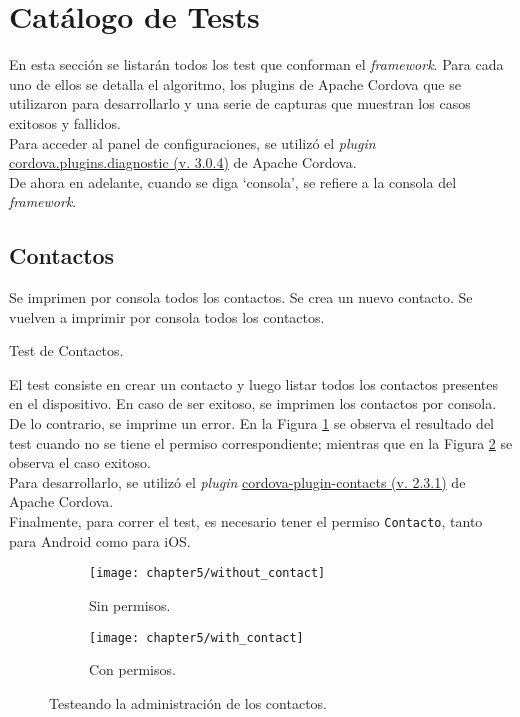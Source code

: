 \section{Catálogo de Tests}
En esta sección se listarán todos los test que conforman el \textit{framework}. Para cada uno de ellos se detalla el algoritmo, los plugins de Apache Cordova que se utilizaron para desarrollarlo y una serie de capturas que muestran los casos exitosos y fallidos.\\

Para acceder al panel de configuraciones, se utilizó el \textit{plugin} \href{https://www.npmjs.com/package/cordova.plugins.diagnostic}{cordova.plugins.diagnostic (v. 3.0.4)} de Apache Cordova.\\

De ahora en adelante, cuando se diga `consola', se refiere a la consola del \textit{framework}.
\subsection{Contactos}
\begin{algorithm}
	\begin{algorithmic}[1]
		\STATE Se imprimen por consola todos los contactos.
		\STATE Se crea un nuevo contacto.
		\STATE Se vuelven a imprimir por consola todos los contactos.
	\end{algorithmic}
	\caption{Test de Contactos.}\label{alg:chap5:test_contactos}
\end{algorithm}
El test consiste en crear un contacto y luego listar todos los contactos presentes en el dispositivo. En caso de ser exitoso, se imprimen los contactos por consola. De lo contrario, se imprime un error. En la Figura \ref{fig:ch05:without_contact} se observa el resultado del test cuando no se tiene el permiso correspondiente; mientras que en la Figura \ref{fig:ch05:with_contact} se observa el caso exitoso.\\

Para desarrollarlo, se utilizó el \textit{plugin} \href{https://www.npmjs.com/package/cordova-plugin-contacts}{cordova-plugin-contacts (v. 2.3.1)} de Apache Cordova.\\

Finalmente, para correr el test, es necesario tener el permiso \texttt{Contacto}, tanto para Android como para iOS.
\begin{figure}[htbp]
    \centering
    \begin{subfigure}{0.3\linewidth}
        \texttt{[image: chapter5/without\_contact]}
        \caption{Sin permisos.}
        \label{fig:ch05:without_contact}
    \end{subfigure}
    \begin{subfigure}{0.3\linewidth}
        \texttt{[image: chapter5/with\_contact]}
        \caption{Con permisos.}
        \label{fig:ch05:with_contact}
    \end{subfigure}
    \caption{Testeando la administración de los contactos.}
	\label{fig:ch05:contacts-cases}
\end{figure}
